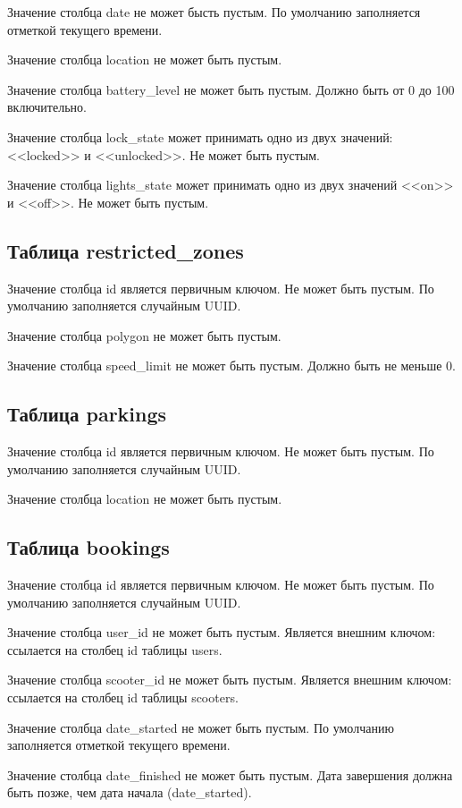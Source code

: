 Значение столбца date не может бысть пустым. По умолчанию заполняется отметкой текущего времени.

Значение столбца location не может быть пустым.

Значение столбца battery\_level не может быть пустым. Должно быть от 0 до 100 включительно.

Значение столбца lock\_state может принимать одно из двух значений: <<locked>> и <<unlocked>>. Не может быть пустым.

Значение столбца lights\_state может принимать одно из двух значений <<on>> и <<off>>. Не может быть пустым.

\subsection{Таблица restricted\_zones}

Значение столбца id является первичным ключом. Не может быть пустым. По умолчанию заполняется случайным UUID.

Значение столбца polygon не может быть пустым.

Значение столбца speed\_limit не может быть пустым. Должно быть не меньше 0.

\subsection{Таблица parkings}

Значение столбца id является первичным ключом. Не может быть пустым. По умолчанию заполняется случайным UUID.

Значение столбца location не может быть пустым.

\subsection{Таблица bookings}

Значение столбца id является первичным ключом. Не может быть пустым. По умолчанию заполняется случайным UUID.

Значение столбца user\_id не может быть пустым. Является внешним ключом: ссылается на столбец id таблицы users.

Значение столбца scooter\_id не может быть пустым. Является внешним ключом: ссылается на столбец id таблицы scooters.

Значение столбца date\_started не может быть пустым. По умолчанию заполняется отметкой текущего времени.

Значение столбца date\_finished не может быть пустым. Дата завершения должна быть позже, чем дата начала (date\_started).

